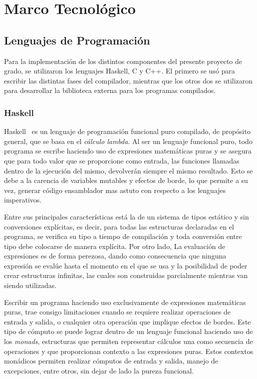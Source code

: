 \chapter{Marco Tecnológico}
\label{capitulo2}



\section{Lenguajes de Programación}

Para la implementación de los distintos componentes del presente proyecto de
grado, se utilizaron los lenguajes Haskell, C y C++. El primero se usó para
escribir las distintas fases del compilador, mientras que los otros dos se
utilizaron para desarrollar la biblioteca externa para los programas
compilados.

\subsection{Haskell}
Haskell~\cite{haskell} es un lenguaje de programación funcional puro compilado, de propósito
general, que se basa en el \textit{cálculo lambda}. Al ser un lenguaje
funcional puro, todo programa se escribe haciendo uso de expresiones
matemáticas puras y se asegura que para todo valor que se proporcione como
entrada, las funciones llamadas dentro de la ejecución del mismo, devolverán
siempre el mismo resultado. Esto se debe a la carencia de variables mutables y
efectos de borde, lo que permite a su vez, generar código ensamblador mas
astuto con respecto a los lenguajes imperativos.

Entre sus principales características está la de un sistema de tipos estático y
sin conversiones explícitas, es decir, para todas las estructuras declaradas en
el programa, se verifica su tipo a tiempo de compilación y toda conversión entre
tipo debe colocarse de manera explícita. Por otro lado, La evaluación de
expresiones es de forma perezosa, dando como consecuencia que ninguna expresión
se evalúe hasta el momento en el que se usa y la posibilidad de poder crear
estructuras infinitas, las cuales son construidas parcialmente mientras van
siendo utilizadas.

Escribir un programa haciendo uso exclusivamente de expresiones matemáticas
puras, trae consigo limitaciones cuando se requiere realizar operaciones de
entrada y salida, o cualquier otra operación que implique efectos de bordes.
Este tipo de cómputo se puede lograr dentro de un lenguaje funcional haciendo
uso de los \textit{monads}, estructuras que permiten representar cálculos una
como secuencia de operaciones y que proporcionan contexto a las expresiones
puras. Estos contextos monádicos permiten realizar cómputos de entrada y
salida, manejo de excepciones, entre otros, sin dejar de lado la pureza
funcional.

